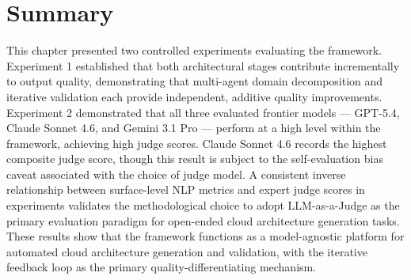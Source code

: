 \section{Summary}

This chapter presented two controlled experiments evaluating the framework. Experiment 1 established that both architectural stages contribute incrementally to output quality, demonstrating that multi-agent domain decomposition and iterative validation each provide independent, additive quality improvements. Experiment 2 demonstrated that all three evaluated frontier models — GPT-5.4, Claude Sonnet 4.6, and Gemini 3.1 Pro — perform at a high level within the framework, achieving high judge scores. Claude Sonnet 4.6 records the highest composite judge score, though this result is subject to the self-evaluation bias caveat associated with the choice of judge model. A consistent inverse relationship between surface-level NLP metrics and expert judge scores in experiments validates the methodological choice to adopt LLM-as-a-Judge as the primary evaluation paradigm for open-ended cloud architecture generation tasks. These results show that the framework functions as a model-agnostic platform for automated cloud architecture generation and validation, with the iterative feedback loop as the primary quality-differentiating mechanism.

